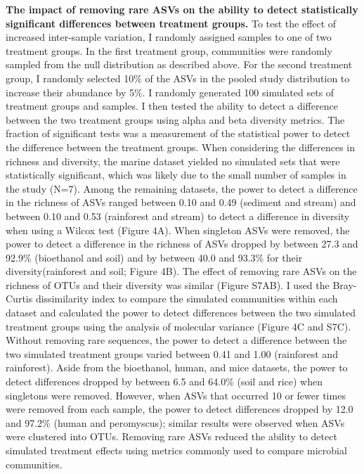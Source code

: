 \documentclass[
]{article}
\begin{document}
\textbf{The impact of removing rare ASVs on the ability to detect
statistically significant differences between treatment groups.} To test
the effect of increased inter-sample variation, I randomly assigned
samples to one of two treatment groups. In the first treatment group,
communities were randomly sampled from the null distribution as
described above. For the second treatment group, I randomly selected
10\% of the ASVs in the pooled study distribution to increase their
abundance by 5\%. I randomly generated 100 simulated sets of treatment
groups and samples. I then tested the ability to detect a difference
between the two treatment groups using alpha and beta diversity metrics.
The fraction of significant tests was a measurement of the statistical
power to detect the difference between the treatment groups. When
considering the differences in richness and diversity, the marine
dataset yielded no simulated sets that were statistically significant,
which was likely due to the small number of samples in the study (N=7).
Among the remaining datasets, the power to detect a difference in the
richness of ASVs ranged between 0.10 and 0.49 (sediment and stream) and
between 0.10 and 0.53 (rainforest and stream) to detect a difference in
diversity when using a Wilcox test (Figure 4A). When singleton ASVs were
removed, the power to detect a difference in the richness of ASVs
dropped by between 27.3 and 92.9\% (bioethanol and soil) and by between
40.0 and 93.3\% for their diversity(rainforest and soil; Figure 4B). The
effect of removing rare ASVs on the richness of OTUs and their diversity
was similar (Figure S7AB). I used the Bray-Curtis dissimilarity index to
compare the simulated communities within each dataset and calculated the
power to detect differences between the two simulated treatment groups
using the analysis of molecular variance (Figure 4C and S7C). Without
removing rare sequences, the power to detect a difference between the
two simulated treatment groups varied between 0.41 and 1.00 (rainforest
and rainforest). Aside from the bioethanol, human, and mice datasets,
the power to detect differences dropped by between 6.5 and 64.0\% (soil
and rice) when singletons were removed. However, when ASVs that occurred
10 or fewer times were removed from each sample, the power to detect
differences dropped by 12.0 and 97.2\% (human and peromyscus); similar
results were observed when ASVs were clustered into OTUs. Removing rare
ASVs reduced the ability to detect simulated treatment effects using
metrics commonly used to compare microbial communities.
\end{document}
